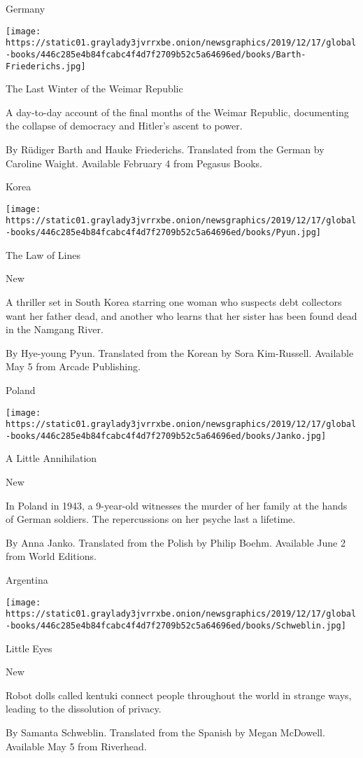 Germany

\texttt{[image: https://static01.graylady3jvrrxbe.onion/newsgraphics/2019/12/17/global-books/446c285e4b84fcabc4f4d7f2709b52c5a64696ed/books/Barth-Friederichs.jpg]}

The Last Winter of the Weimar Republic

A day-to-day account of the final months of the Weimar Republic,
documenting the collapse of democracy and Hitler's ascent to power.

 By Rüdiger Barth and Hauke Friederichs. Translated from the German by
Caroline Waight. Available February 4 from Pegasus Books.

Korea

\texttt{[image: https://static01.graylady3jvrrxbe.onion/newsgraphics/2019/12/17/global-books/446c285e4b84fcabc4f4d7f2709b52c5a64696ed/books/Pyun.jpg]}

The Law of Lines

New

A thriller set in South Korea starring one woman who suspects debt
collectors want her father dead, and another who learns that her sister
has been found dead in the Namgang River.

 By Hye-young Pyun. Translated from the Korean by Sora Kim-Russell.
Available May 5 from Arcade Publishing.

Poland

\texttt{[image: https://static01.graylady3jvrrxbe.onion/newsgraphics/2019/12/17/global-books/446c285e4b84fcabc4f4d7f2709b52c5a64696ed/books/Janko.jpg]}

A Little Annihilation

New

In Poland in 1943, a 9-year-old witnesses the murder of her family at
the hands of German soldiers. The repercussions on her psyche last a
lifetime.

 By Anna Janko. Translated from the Polish by Philip Boehm. Available
June 2 from World Editions.

Argentina

\texttt{[image: https://static01.graylady3jvrrxbe.onion/newsgraphics/2019/12/17/global-books/446c285e4b84fcabc4f4d7f2709b52c5a64696ed/books/Schweblin.jpg]}

Little Eyes

New

Robot dolls called kentuki connect people throughout the world in
strange ways, leading to the dissolution of privacy.

 By Samanta Schweblin. Translated from the Spanish by Megan McDowell.
Available May 5 from Riverhead.

